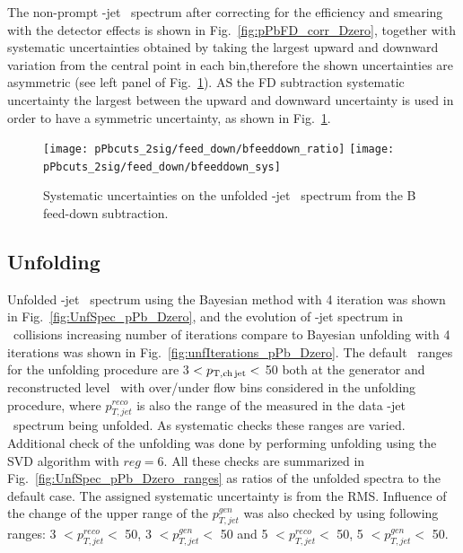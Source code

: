 The non-prompt \Dzero-jet \pt\ spectrum after correcting for the efficiency and smearing with the detector effects is shown in Fig.~\ref{fig:pPbFD_corr_Dzero}, together with systematic uncertainties obtained by taking the largest upward and downward variation from the central point in each bin,therefore the shown uncertainties are asymmetric (see left panel of Fig.~\ref{fig:BFeedDown_sysUnc_Dzero}). AS the FD subtraction systematic uncertainty the largest between the upward and downward uncertainty is used in order to have a symmetric uncertainty, as shown in Fig.~\ref{fig:BFeedDown_sysUnc_Dzero}.

\begin{figure}[bth]
\begin{center}
\texttt{[image: pPbcuts\_2sig/feed\_down/bfeeddown\_ratio]}
\texttt{[image: pPbcuts\_2sig/feed\_down/bfeeddown\_sys]}
\caption{Systematic uncertainties on the unfolded \Dzero-jet \pt\ spectrum from the B feed-down subtraction.} 
\label{fig:BFeedDown_sysUnc_Dzero}
\end{center}
\end{figure}


\subsection{Unfolding}
\label{sUnfoldSys}

Unfolded \Dzero-jet \pt\ spectrum using the Bayesian method with 4 iteration was shown in Fig.~\ref{fig:UnfSpec_pPb_Dzero}, and the evolution of \Dzero-jet spectrum in \pp\ collisions increasing number of iterations compare to Bayesian unfolding with 4 iterations was shown in Fig.~\ref{fig:unfIterations_pPb_Dzero}. 
The default \ptchjet\ ranges for the unfolding procedure are 3 $< p_{\mathrm{T,ch\, jet}}< $ 50 both at the generator and reconstructed level \pt\, with over/under flow bins considered in the unfolding procedure, where $p_{T,jet}^{reco}$ is also the range of the measured in the data \Dzero-jet \pt\ spectrum being unfolded. 
As systematic checks these ranges are varied.
Additional check of the unfolding was done by performing unfolding using the SVD algorithm with $reg=6$.
All these checks are summarized in Fig.~\ref{fig:UnfSpec_pPb_Dzero_ranges} as ratios of the unfolded spectra to the default case. The assigned systematic uncertainty is from the RMS.
Influence of the change of the upper range of the $p_{T,jet}^{gen}$ was also checked by using following ranges: 3 $<  p_{T,jet}^{reco} < $ 50, 3 $<  p_{T,jet}^{gen} < $ 50 and 5 $<  p_{T,jet}^{reco} < $ 50, 5 $<  p_{T,jet}^{gen} < $ 50. 

